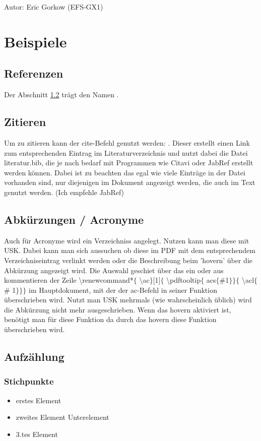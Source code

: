  Autor: Eric Gorkow (EFS-GX1)

\chapter{Beispiele}
\section{Referenzen}
Der Abschnitt \ref{sec:zitieren} trägt den Namen .

\section{Zitieren} \label{sec:zitieren}
Um zu zitieren kann der cite-Befehl genutzt werden: \cite{Wer2011}. Dieser erstellt einen Link zum entsprechenden Eintrag im Literaturverzeichnis und nutzt dabei die Datei literatur.bib, die je nach bedarf mit Programmen wie Citavi oder JabRef erstellt werden können. Dabei ist zu beachten das egal wie viele Einträge in der Datei vorhanden sind, nur diejenigen im Dokument angezeigt werden, die auch im Text genutzt werden. (Ich empfehle JabRef)

\section{Abkürzungen / Acronyme}
Auch für Acronyme wird ein Verzeichniss angelegt. Nutzen kann man diese mit \ac{USK}. Dabei kann man sich aussuchen ob diese im PDF mit dem entsprechendem Verzeichniseintrag verlinkt werden oder die Beschreibung beim 'hovern' über die Abkürzung angezeigt wird. Die Auswahl geschiet über das ein oder aus kommentieren der Zeile \textbackslash renewcommand*$\lbrace$ \textbackslash ac$\rbrace$[1]$\lbrace$ \textbackslash pdftooltip$\lbrace$ acs$\lbrace$\#1$ \rbrace\rbrace\lbrace$ \textbackslash acl$\lbrace$\# 1$\rbrace\rbrace\rbrace$ im Hauptdokument, mit der der ac-Befehl in seiner Funktion überschrieben wird. Nutzt man \ac{USK} mehrmals (wie wahrscheinlich üblich) wird die Abkürzung nicht mehr ausgeschrieben. Wenn das hovern aktiviert ist, benötigt man für diese Funktion  da durch das hovern diese Funktion überschrieben wird.

\section{Aufzählung}
\subsection{Stichpunkte}
\begin{itemize}
	\item erstes Element
	\item zweites Element
	\subitem  Unterelement
	\item 3.tes Element
\end{itemize}

